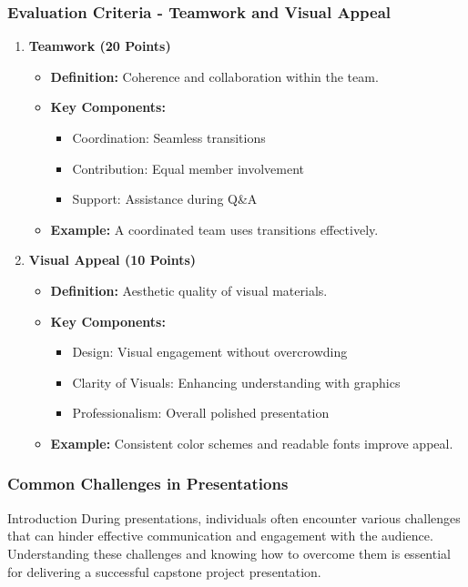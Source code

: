 \documentclass{beamer}
\begin{document}
\begin{frame}[fragile]
    \frametitle{Evaluation Criteria - Teamwork and Visual Appeal}
    \begin{enumerate}[resume]
        \item \textbf{Teamwork (20 Points)}
            \begin{itemize}
                \item \textbf{Definition:} Coherence and collaboration within the team.
                \item \textbf{Key Components:}
                    \begin{itemize}
                        \item Coordination: Seamless transitions
                        \item Contribution: Equal member involvement
                        \item Support: Assistance during Q\&A
                    \end{itemize}
                \item \textbf{Example:} A coordinated team uses transitions effectively.
            \end{itemize}
    
        \item \textbf{Visual Appeal (10 Points)}
            \begin{itemize}
                \item \textbf{Definition:} Aesthetic quality of visual materials.
                \item \textbf{Key Components:}
                    \begin{itemize}
                        \item Design: Visual engagement without overcrowding
                        \item Clarity of Visuals: Enhancing understanding with graphics
                        \item Professionalism: Overall polished presentation
                    \end{itemize}
                \item \textbf{Example:} Consistent color schemes and readable fonts improve appeal.
            \end{itemize} 
    \end{enumerate}
\end{frame}

\begin{frame}[fragile]
    \frametitle{Common Challenges in Presentations}
    
    \begin{block}{Introduction}
        During presentations, individuals often encounter various challenges that can hinder effective communication and engagement with the audience. 
        Understanding these challenges and knowing how to overcome them is essential for delivering a successful capstone project presentation.
    \end{block}
\end{frame}
\end{document}
